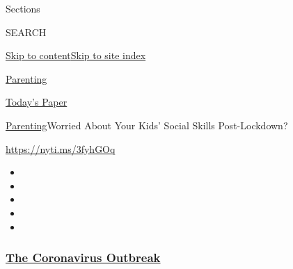 Sections

SEARCH

\protect\hyperlink{site-content}{Skip to
content}\protect\hyperlink{site-index}{Skip to site index}

\href{https://www.nytimes3xbfgragh.onion/section/parenting}{Parenting}

\href{https://myaccount.nytimes3xbfgragh.onion/auth/login?response_type=cookie\&client_id=vi}{}

\href{https://www.nytimes3xbfgragh.onion/section/todayspaper}{Today's
Paper}

\href{/section/parenting}{Parenting}\textbar{}Worried About Your Kids'
Social Skills Post-Lockdown?

\url{https://nyti.ms/3fyhGOq}

\begin{itemize}
\item
\item
\item
\item
\item
\end{itemize}

\hypertarget{the-coronavirus-outbreak}{%
\subsubsection{\texorpdfstring{\href{https://www.nytimes3xbfgragh.onion/news-event/coronavirus?name=styln-coronavirus-national\&region=TOP_BANNER\&block=storyline_menu_recirc\&action=click\&pgtype=Article\&impression_id=a3ff7030-f4c6-11ea-a7aa-59ff5ebfc7d3\&variant=undefined}{The
Coronavirus
Outbreak}}{The Coronavirus Outbreak}}\label{the-coronavirus-outbreak}}

